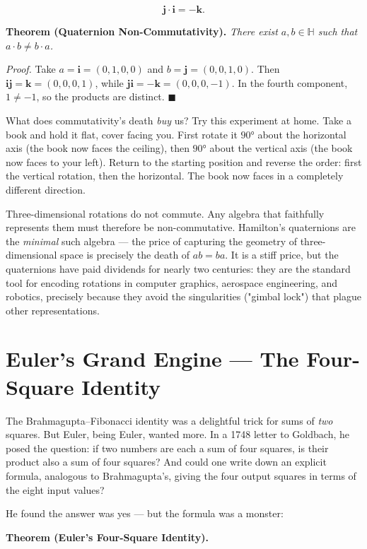 \documentclass[11pt,twoside,openright]{book}
\theoremstyle{definition}
\theoremstyle{remark}
\begin{document}
\[\mathbf{j} \cdot \mathbf{i} = -\mathbf{k}.\]

\textbf{Theorem (Quaternion Non-Commutativity).} \textit{There exist $a, b \in \mathbb{H}$ such that $a \cdot b \neq b \cdot a$.}

\textit{Proof.} Take $a = \mathbf{i} = (0, 1, 0, 0)$ and $b = \mathbf{j} = (0, 0, 1, 0)$. Then $\mathbf{i}\mathbf{j} = \mathbf{k} = (0, 0, 0, 1)$, while $\mathbf{j}\mathbf{i} = -\mathbf{k} = (0, 0, 0, -1)$. In the fourth component, $1 \neq -1$, so the products are distinct. $\blacksquare$


What does commutativity's death \textit{buy} us? Try this experiment at home. Take a book and hold it flat, cover facing you. First rotate it $90°$ about the horizontal axis (the book now faces the ceiling), then $90°$ about the vertical axis (the book now faces to your left). Return to the starting position and reverse the order: first the vertical rotation, then the horizontal. The book now faces in a completely different direction.


Three-dimensional rotations do not commute. Any algebra that faithfully represents them must therefore be non-commutative. Hamilton's quaternions are the \textit{minimal} such algebra --- the price of capturing the geometry of three-dimensional space is precisely the death of $ab = ba$. It is a stiff price, but the quaternions have paid dividends for nearly two centuries: they are the standard tool for encoding rotations in computer graphics, aerospace engineering, and robotics, precisely because they avoid the singularities ("gimbal lock") that plague other representations.


\section{Euler's Grand Engine --- The Four-Square Identity}

The Brahmagupta--Fibonacci identity was a delightful trick for sums of \textit{two} squares. But Euler, being Euler, wanted more. In a 1748 letter to Goldbach, he posed the question: if two numbers are each a sum of four squares, is their product also a sum of four squares? And could one write down an explicit formula, analogous to Brahmagupta's, giving the four output squares in terms of the eight input values?

He found the answer was yes --- but the formula was a monster:

\textbf{Theorem (Euler's Four-Square Identity).}
\end{document}
